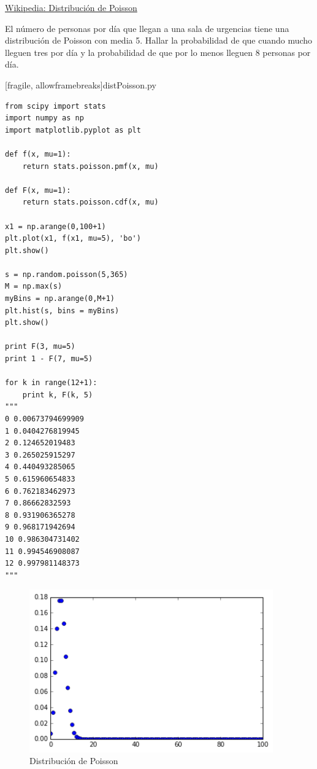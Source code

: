 \href{https://es.wikipedia.org/wiki/Distribuci\%C3\%B3n_de_Poisson}{Wikipedia: Distribución de Poisson}


 \begin{ejemplo}
  \label{exmp:7.6}
  El número de personas por día que llegan a una sala de urgencias tiene una distribución de Poisson con media 5. Hallar la probabilidad de que cuando mucho lleguen tres por día y la probabilidad de que por lo menos lleguen 8 personas por día.
 \end{ejemplo}




[fragile, allowframebreaks]{distPoisson.py}
 \begin{verbatim}
from scipy import stats
import numpy as np
import matplotlib.pyplot as plt

def f(x, mu=1):
    return stats.poisson.pmf(x, mu)

def F(x, mu=1):
    return stats.poisson.cdf(x, mu)

x1 = np.arange(0,100+1)
plt.plot(x1, f(x1, mu=5), 'bo')
plt.show()

s = np.random.poisson(5,365)
M = np.max(s)
myBins = np.arange(0,M+1)
plt.hist(s, bins = myBins)
plt.show()

print F(3, mu=5)
print 1 - F(7, mu=5)

for k in range(12+1):
    print k, F(k, 5)
"""
0 0.00673794699909
1 0.0404276819945
2 0.124652019483
3 0.265025915297
4 0.440493285065
5 0.615960654833
6 0.762183462973
7 0.86662832593
8 0.931906365278
9 0.968171942694
10 0.986304731402
11 0.994546908087
12 0.997981148373
"""
 \end{verbatim}



 \begin{figure}[h]
 \centering
 \includegraphics[height=7cm,keepaspectratio=true]{./pe/distPoisson0.png}
 \caption{Distribución de Poisson}
\end{figure}




